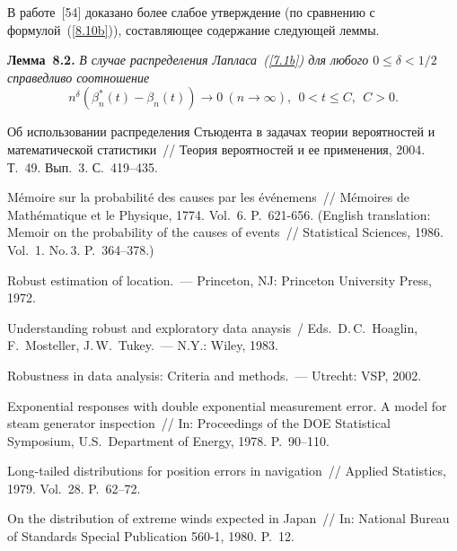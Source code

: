 \begin{multicols}{2}
В  работе~[54] доказано более
слабое утверждение (по сравнению с формулой~(\ref{8.10b})), составляющее
содержание следующей леммы.

\medskip

\noindent
{\bf Лемма~8.2.} {\it В случае распределения Лапласа~(\ref{7.1b})
для любого $0\le\delta<1/2$ справедливо
соотношение}
\begin{equation*}
n^{\delta}(\beta_n^*(t)-\beta_n(t))\to 0\  (n\to\infty),\ \ 
 0<t\le C, \ \  C>0.
\end{equation*}


{\small\frenchspacing
{%
\begin{thebibliography}{99}

Об использовании распределения Стьюдента
в задачах теории вероятностей и математической статистики~//
Теория
вероятностей и ее применения, 2004. Т.~49. Вып.~3. С.~419--435.

M{\'e}moire sur la probabilit{\'e} des causes par les
{\'e}v{\'e}nemens~// M{\'e}moires de Math{\'e}matique et le
Physique, 1774. Vol.~6. P.~621-656. (English translation: Memoir
on the probability of the causes of events~// Statistical
Sciences, 1986. Vol.~1. No.\,3. P.~364--378.)

Robust estimation of location.~--- Princeton, NJ:  Princeton
University Press, 1972.

Understanding
robust and exploratory data anaysis~/
Eds.\ D.\,C.~Hoaglin, F.~Mosteller, J.\,W.~Tukey.~---
 N.Y.: Wiley, 1983.
 
Robustness in data analysis:
Criteria and methods.~--- Utrecht: VSP,  2002.

Exponential responses with double exponential
measurement error. A model for steam generator inspection~// In: 
Proceedings of the DOE Statistical Symposium, U.S.\ Department of
Energy, 1978. P.~90--110.

Long-tailed distributions for position errors in navigation~//
Applied Statistics, 1979. Vol.~28. P.~62--72.

On the distribution of extreme winds expected
in Japan~// In: National Bureau of Standards Special Publication
560-1, 1980. P.~12.


\end{thebibliography}}}
\end{multicols}
